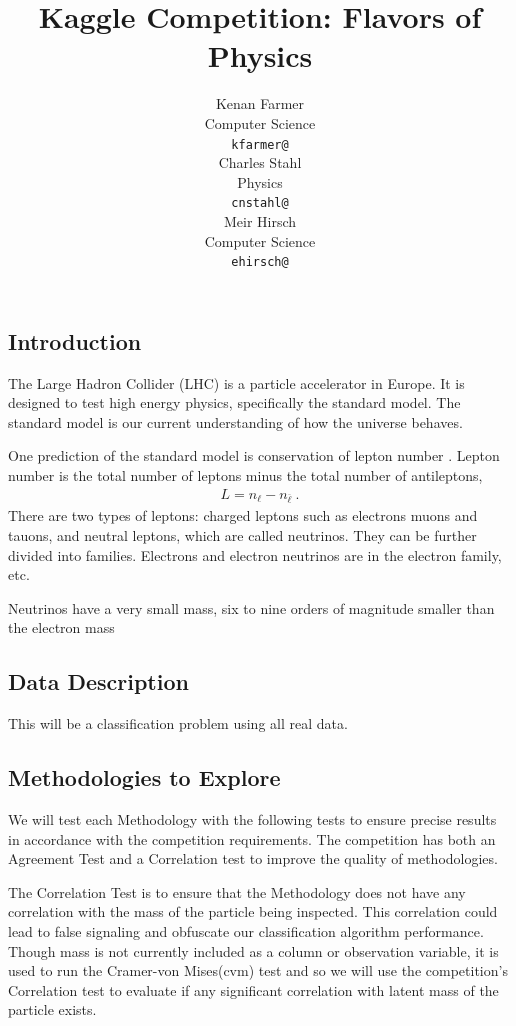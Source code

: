 \documentclass{article} %
\title{Kaggle Competition: Flavors of Physics}
\author{
Kenan Farmer\\
Computer Science\\
\texttt{kfarmer@} \\
\And
Charles Stahl \\
Physics \\
\texttt{cnstahl@} \\
\And
Meir Hirsch\\
Computer Science \\
\texttt{ehirsch@} \\
}
\begin{document}
\maketitle

\subsection*{Introduction}

The Large Hadron Collider (LHC) is a particle accelerator in Europe. It is designed to test high energy physics, specifically the standard model. The standard model is our current understanding of how the universe behaves. 

One prediction of the standard model is conservation of lepton number \cite{griff87}. Lepton number is the total number of leptons minus the total number of antileptons,
\begin{align}
L=n_{\ell }-n_{\overline {\ell }}~.
\end{align}
There are two types of leptons: charged leptons such as electrons muons and tauons, and neutral leptons, which are called neutrinos. They can be further divided into families. Electrons and electron neutrinos are in the electron family, etc.

Neutrinos have a very small mass, six to nine orders of magnitude smaller than the electron mass 

\subsection*{Data Description}

This will be a classification problem using all real data.

\subsection*{Methodologies to Explore}


We will test each Methodology with the following tests to ensure precise results in accordance with the competition requirements. The competition has both an Agreement Test and a Correlation test to improve the quality of methodologies.

The Correlation Test is to ensure that the Methodology does not have any correlation with the mass of the particle being inspected. This correlation could lead to false signaling and obfuscate our classification algorithm performance. Though mass is not currently included as a column or observation variable, it is used to run the Cramer-von Mises(cvm) test and so we will use the competition's Correlation test to evaluate if any significant correlation with latent mass of the particle exists.
\end{document}
